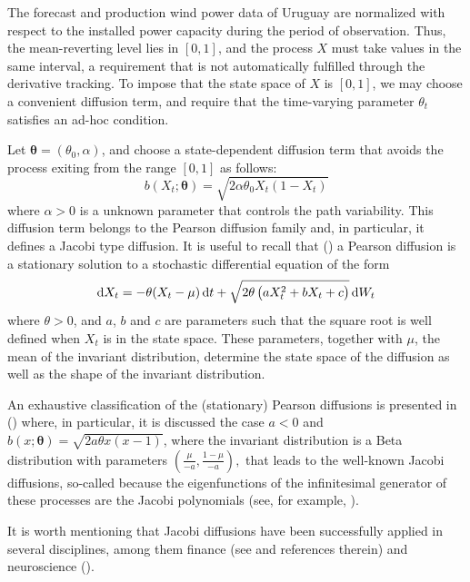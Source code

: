 \documentclass[11pt]{article}
\theoremstyle{definition}
\begin{document}
The forecast and production wind power data of Uruguay are normalized with respect to the installed power capacity during the period of observation. Thus, the mean-reverting level lies in $[0,1]$, and the process $X$  must take values in the same interval, a requirement that is not automatically fulfilled through the derivative tracking. To impose that the state space of $X$ is $[0,1]$, we may choose a convenient diffusion term, and require that the time-varying parameter $ \theta_t$ satisfies an ad-hoc condition.
 
Let $\bm{\theta} = (\theta_0,\alpha)$, and choose a state-dependent diffusion term that avoids the process exiting from the range $[0,1]$ as follows:
  \begin{equation}
    b (X_t; \bm{\theta} )= \sqrt{2 \alpha \theta_0 X_t (1 - X_t)}
  \end{equation}
  where $\alpha >0$ is a unknown parameter that controls the path variability. This diffusion term belongs to the Pearson diffusion family and, in particular, it defines a Jacobi type diffusion. It is useful to recall that (\cite[440]{foso}) a Pearson diffusion is a stationary solution to a stochastic differential equation of the form
 \begin{equation}
    \dif X_t = - \theta (X_t - \mu)\dif t + \sqrt{2 \theta \left(a X_t^2 + b X_t + c\right)} \dif W_t
  \end{equation}
where $\theta>0$, and $a$, $b$ and $c$ are parameters such that the square root is well defined when $X_t$ is in the state space. These parameters, together with $\mu$, the mean of the invariant distribution, determine the state space of the diffusion as well as the shape of the invariant distribution.

An exhaustive classification of the (stationary) Pearson diffusions is presented in (\cite[440-443]{foso}) where, in particular, it is discussed the case $a < 0$ and $b(x; \bm{\theta}) = \sqrt{2 a \theta x (x-1)}$, where the invariant distribution is a Beta distribution with parameters $\left( \frac{\mu}{-a}, \frac{1 - \mu}{-a} \right),$ that leads to the well-known Jacobi diffusions, so-called because the eigenfunctions of the infinitesimal generator of these processes are the Jacobi polynomials (see, for example, \cite[2860-2861]{leph}). 

It is worth mentioning that Jacobi diffusions have been successfully applied in several disciplines, among them finance (see \cite{vago} and references therein) and neuroscience (\cite{dotala}).
\end{document}

